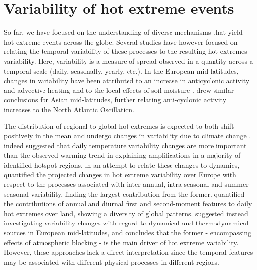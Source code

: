 \documentclass[11pt,a4paper,twoside,openright]{report}
\theoremstyle{definition}
\begin{document}
\section{Variability of hot extreme events}\label{variability-of-hot-extreme-events}

So far, we have focused on the understanding of diverse mechanisms that yield hot extreme events across the globe. Several studies have however focused on relating the temporal variability of these processes to the resulting hot extremes variability. Here, variability is a measure of spread observed in a quantity across a temporal scale (daily, seasonally, yearly, etc.). In the European mid-latitudes, changes in variability have been attributed to an increase in anticyclonic activity and advective heating \citep{lenderink_summertime_2007,horton_contribution_2015,holmes_robust_2015} and to the local effects of soil-moisture \citep{quesada_asymmetric_2012,whan_impact_2015,donat_regional_2017,vogel_effects_2019}. \cite{wang_decadal_2023} drew similar conclusions for Asian mid-latitudes, further relating anti-cyclonic activity increases to the North Atlantic Oscillation.

The distribution of regional-to-global hot extremes is expected to both shift positively in the mean and undergo changes in variability due to climate change \citep{lewis_evolution_2017,mckinnon_changing_2016,slater_substantial_2021,fischer_increasing_2021,thompson_2021_2022}. \cite{simolo_quantifying_2022} indeed suggested that daily temperature variability changes are more important than the observed warming trend in explaining amplifications in a majority of identified hotspot regions. In an attempt to relate these changes to dynamics, \cite{fischer_future_2009} quantified the projected changes in hot extreme variability over Europe with respect to the processes associated with inter-annual, intra-seasonal and summer seasonal variability, finding the largest contribution from the former. \cite{di_luca_contribution_2020} quantified the contributions of annual and diurnal first and second-moment features to daily hot extremes over land, showing a diversity of global patterns. \cite{suarez-gutierrez_dynamical_2020} suggested instead investigating variability changes with regard to dynamical and thermodynamical sources in European mid-latitudes, and concludes that the former - encompassing effects of atmospheric blocking - is the main driver of hot extreme variability. However, these approaches lack a direct interpretation since the temporal features may be associated with different physical processes in different regions.
\end{document}
